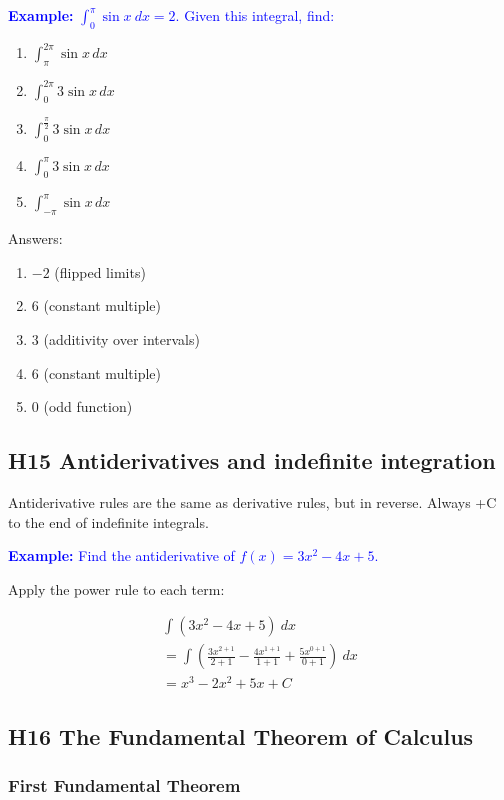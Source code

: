 \documentclass[letterpaper, 12pt]{article}
\newcommand{\example}[1]{\textcolor{blue}{\textbf{Example:} #1}}
\begin{document}
\example{$\displaystyle \int_0^\pi \sin x \: dx = 2$. Given this integral, find:}

\begin{enumerate}[label=\alph*)]
\item $\displaystyle \int_{\pi}^{2\pi} \sin x \, dx$
\item $\displaystyle \int_0^{2\pi} 3 \sin x \, dx$
\item $\displaystyle \int_0^{\frac{\pi}{2}} 3 \sin x \, dx$
\item $\displaystyle \int_0^{\pi} 3 \sin x \, dx$
\item $\displaystyle \int_{-\pi}^{\pi} \sin x \, dx$
\end{enumerate}

Answers:

\begin{enumerate}[label=\alph*)]
\item $-2$ (flipped limits)
\item $6$ (constant multiple)
\item $3$ (additivity over intervals)
\item $6$ (constant multiple)
\item $0$ (odd function)
\end{enumerate}


\subsection*{H15 Antiderivatives and indefinite integration}

Antiderivative rules are the same as derivative rules, but in reverse. Always +C to the end of indefinite integrals.

\example{Find the antiderivative of $\displaystyle f(x) = 3x^2 - 4x + 5$.}

Apply the power rule to each term:

\begin{gather*}
\int (3x^2 - 4x + 5) \: dx \\
= \int (\frac{3x^{2+1}}{2+1} - \frac{4x^{1+1}}{1+1} + \frac{5x^{0+1}}{0+1}) \: dx \\
= \boxed{x^3 - 2x^2 + 5x + C}
\end{gather*}

\subsection*{H16 The Fundamental Theorem of Calculus}

\subsubsection*{First Fundamental Theorem}
\end{document}
